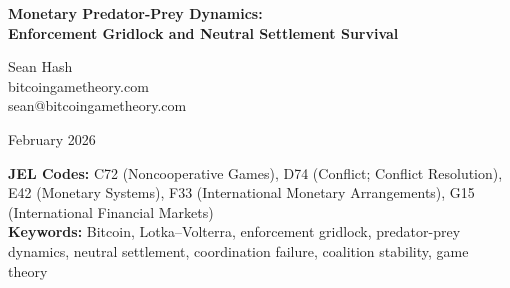 \documentclass[12pt]{article}
\theoremstyle{definition}
\theoremstyle{remark}
\begin{document}

\begin{center}
{\LARGE\bfseries Monetary Predator-Prey Dynamics:\\Enforcement Gridlock and Neutral Settlement Survival}

\bigskip

{\large Sean Hash}\\
bitcoingametheory.com\\
sean@bitcoingametheory.com

\bigskip

February 2026

\medskip

{\small
\textbf{JEL Codes:} C72 (Noncooperative Games), D74 (Conflict; Conflict Resolution), E42 (Monetary Systems), F33 (International Monetary Arrangements), G15 (International Financial Markets)\\[4pt]
\textbf{Keywords:} Bitcoin, Lotka--Volterra, enforcement gridlock, predator-prey dynamics, neutral settlement, coordination failure, coalition stability, game theory
}
\end{center}

\bigskip


\begin{abstract}
\noindent
This paper formalizes the survivability question for neutral settlement:
\emph{why can enforcement actors not coordinate to suppress it?} We model
enforcement actors as ``predators'' (coordination taxers) and neutral
settlement rail usage as ``prey'' within a multi-predator Lotka--Volterra
framework. When inter-predator competition coefficients are strictly
positive---a condition guaranteed by geopolitical multipolarity---the
interior equilibrium ensures prey survival ($x^{*} > 0$). We prove that
no stable suppression coalition exists: for any proposed coalition, at
least one member gains by defecting (Theorem~\ref{thm:gridlock}).
Further, we establish that each enforcer's dominant strategy is to
preserve neutral rail access as a hedge against rival enforcers' monetary
weaponization (Lemma~\ref{lem:hedging}). Finally, we introduce duration
fragility inequalities (Proposition~\ref{prop:duration}) showing that
equity valuations suffer terminal value collapse under AI-driven moat
erosion, strengthening the marginal case for scarcity-based settlement.
These results complete the causal chain from Hash~(2026a): the
coordination failure in the exit game is not merely possible but
\emph{structurally guaranteed} by inter-predator competition.
\end{abstract}
\end{document}
